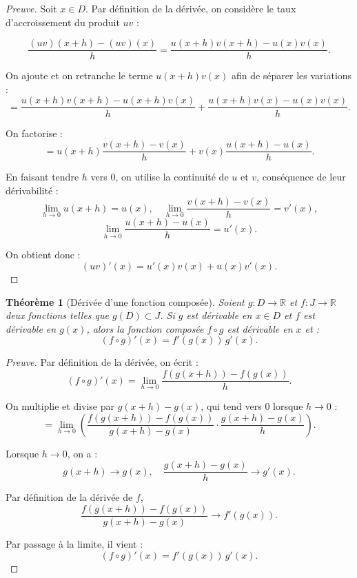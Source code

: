 \documentclass{report} %
\theoremstyle{definition}  %
\theoremstyle{plain} %
\newtheorem{theorem}{Théorème}[chapter]
\theoremstyle{remark} %
\begin{document}
\begin{proof}[Preuve]
Soit \(x \in D\).  
Par définition de la dérivée, on considère le taux d'accroissement du produit \(uv\) :

\[
\frac{(uv)(x+h) - (uv)(x)}{h}
= \frac{u(x+h)v(x+h) - u(x)v(x)}{h}.
\]

On ajoute et on retranche le terme \(u(x+h)v(x)\) afin de séparer les variations :
\[
= \frac{u(x+h)v(x+h) - u(x+h)v(x)}{h}
+ \frac{u(x+h)v(x) - u(x)v(x)}{h}.
\]

On factorise :
\[
= u(x+h)\frac{v(x+h) - v(x)}{h}
+ v(x)\frac{u(x+h) - u(x)}{h}.
\]

En faisant tendre \(h\) vers \(0\), on utilise la continuité de \(u\) et \(v\), conséquence de leur dérivabilité :
\[
\lim_{h \to 0} u(x+h) = u(x), \quad
\lim_{h \to 0} \frac{v(x+h) - v(x)}{h} = v'(x),
\]
\[
\lim_{h \to 0} \frac{u(x+h) - u(x)}{h} = u'(x).
\]

On obtient donc :
\[
(uv)'(x) = u'(x)v(x) + u(x)v'(x).
\]
\end{proof}

\bigskip

\begin{theorem}[Dérivée d’une fonction composée]
Soient \(g : D \to \mathbb{R}\) et \(f : J \to \mathbb{R}\) deux fonctions telles que
\(g(D) \subset J\).  
Si \(g\) est dérivable en \(x \in D\) et \(f\) est dérivable en \(g(x)\), alors la fonction
composée \(f \circ g\) est dérivable en \(x\) et :
\[
(f \circ g)'(x) = f'(g(x))\,g'(x).
\]
\end{theorem}

\medskip

\begin{proof}[Preuve]
Par définition de la dérivée, on écrit :
\[
(f \circ g)'(x)
= \lim_{h \to 0} \frac{f(g(x+h)) - f(g(x))}{h}.
\]

On multiplie et divise par \(g(x+h) - g(x)\), qui tend vers \(0\) lorsque \(h \to 0\) :
\[
= \lim_{h \to 0}
\left(
\frac{f(g(x+h)) - f(g(x))}{g(x+h) - g(x)}
\cdot
\frac{g(x+h) - g(x)}{h}
\right).
\]

Lorsque \(h \to 0\), on a :
\[
g(x+h) \to g(x),
\quad
\frac{g(x+h) - g(x)}{h} \to g'(x).
\]

Par définition de la dérivée de \(f\),
\[
\frac{f(g(x+h)) - f(g(x))}{g(x+h) - g(x)} \to f'(g(x)).
\]

Par passage à la limite, il vient :
\[
(f \circ g)'(x) = f'(g(x))\,g'(x).
\]

\end{proof}
\end{document}
